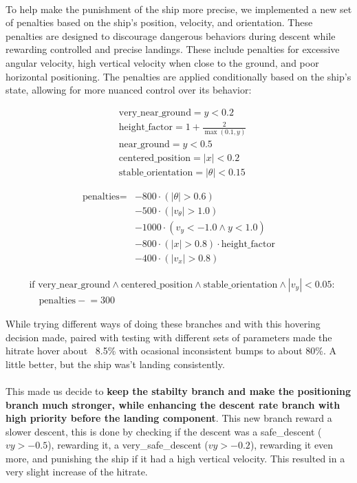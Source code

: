 \documentclass[a4paper, 12pt, fleqn]{report}
\begin{document}
    \noindent
    \\
    To help make the punishment of the ship more precise, we implemented a new set of penalties based on the ship's position, velocity, and orientation. These penalties are designed to discourage dangerous behaviors during descent while rewarding controlled and precise landings.
    These include penalties for excessive angular velocity, high vertical velocity when close to the ground, and poor horizontal positioning. The penalties are applied conditionally based on the ship's state, allowing for more nuanced control over its behavior:
    \\
{\scriptsize
\begin{center}
    \begin{align*}
        & \text{very\_near\_ground} = y < 0.2 \\
        & \text{height\_factor} = 1 + \frac{2}{\max(0.1, y)} \\[0.5em]
        & \text{near\_ground} = y < 0.5 \\
        & \text{centered\_position} = |x| < 0.2 \\
        & \text{stable\_orientation} = |\theta| < 0.15
    \end{align*}
    
    \begin{align*}
        \text{penalties} = {} 
        & -800 \cdot (|\theta| > 0.6) \\
        & -500 \cdot (|v_\theta| > 1.0) \\
        & -1000 \cdot (v_y < -1.0 \land y < 1.0) \\
        & -800 \cdot (|x| > 0.8) \cdot \text{height\_factor} \\
        & -400 \cdot (|v_x| > 0.8)
    \end{align*}
    
    \begin{align*}
        & \text{if very\_near\_ground} \land \text{centered\_position} \land \text{stable\_orientation} \land |v_y| < 0.05: \\
        & \quad \text{penalties} \mathrel{-}= 300
    \end{align*}
\end{center}
}

\noindent
    While trying different ways of doing these branches and  with this hovering decision made, paired with testing with different sets of parameters made the hitrate hover about ~8.5\% with ocasional inconsistent bumps to about 80\%. A little better, but the ship was't landing consistently.
    \noindent
    \\
    \\This made us decide to \textbf{keep the stabilty branch and make the positioning branch much stronger, while enhancing the descent rate branch with high priority before the landing component}.
    This new branch reward a slower descent, this is done by checking if the descent was a safe\_descent ($vy > -0.5$), rewarding it, a very\_safe\_descent ($vy > -0.2$), rewarding it even more, and punishing the ship if it had a high vertical velocity. This resulted in a very slight increase of the hitrate.
    
\end{document}
